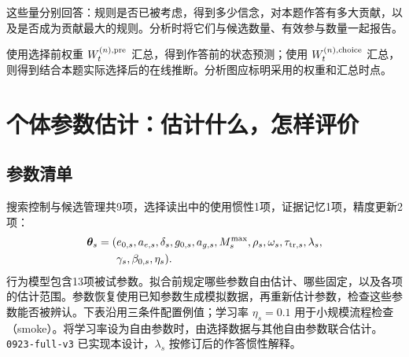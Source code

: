 \documentclass[12pt]{article}
\begin{document}
这些量分别回答：规则是否已被考虑，得到多少信念，对本题作答有多大贡献，以及是否成为贡献最大的规则。分析时将它们与候选数量、有效参与数量一起报告。

使用选择前权重 $W_t^{(n),{\rm pre}}$ 汇总，得到作答前的状态预测；使用 $W_t^{(n),{\rm choice}}$ 汇总，则得到结合本题实际选择后的在线推断。分析图应标明采用的权重和汇总时点。

\section{个体参数估计：估计什么，怎样评价}
\label{sec:parameters}

\subsection{参数清单}

搜索控制与候选管理共9项，选择读出中的使用惯性1项，证据记忆1项，精度更新2项：
\begin{align}
\bm\theta_s=(&e_{0,s},a_{e,s},\delta_s,g_{0,s},a_{g,s},
M_s^{\max},\rho_s,\omega_s,\tau_{{\rm tr},s},\lambda_s,\nonumber\\
&\gamma_s,\beta_{0,s},\eta_s).
\end{align}
行为模型包含13项被试参数。拟合前规定哪些参数自由估计、哪些固定，以及各项的估计范围。参数恢复使用已知参数生成模拟数据，再重新估计参数，检查这些参数能否被辨认。下表沿用三条件配置例值；学习率 $\eta_s=0.1$ 用于小规模流程检查（smoke）。将学习率设为自由参数时，由选择数据与其他自由参数联合估计。\texttt{0923-full-v3} 已实现本设计，$\lambda_s$ 按修订后的作答惯性解释。
\end{document}
